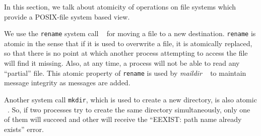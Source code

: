 In this section, we talk about atomicity of operations on file systems which provide a POSIX-file system based view.

We use the \texttt{rename} system call ~\cite{renamemanpage} for moving a file to a new destination. \texttt{rename} is atomic in the sense that if it is used to overwrite a file, it is atomically replaced, so that there is no point at which another process attempting to access the file will find it missing. Also, at any time, a process will not be able to read any ``partial'' file. This atomic property of \texttt{rename} is used by \textit{maildir} ~\cite{bernstein1995using}
to maintain message integrity as messages are added.

Another system call \texttt{mkdir}, which is used to create a new directory, is also atomic ~\cite{mkdirmanpage}. So, if two processes try to create the same directory simultaneously, only one of them will succeed and other will receive the ``EEXIST: path name already exists'' error.
